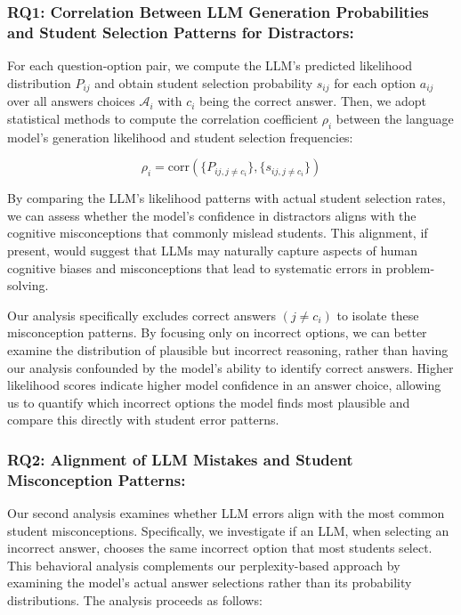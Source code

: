 \subsubsection{RQ1: Correlation Between LLM Generation Probabilities and Student Selection Patterns for Distractors:}

For each question-option pair, we compute the LLM's predicted likelihood distribution $P_{ij}$ and obtain student selection probability $s_{ij}$ for each option $a_{ij}$ over all answers choices $\mathcal{A}_i$ with $c_i$ being the correct answer. Then, we adopt statistical methods to compute the correlation coefficient $\rho_i$ between the language model's generation likelihood and student selection frequencies:

\begin{equation}
    \rho_i = \text{corr}(\{P_{ij, j \neq c_i}\}, \{s_{ij, j \neq c_i}\})
\end{equation}

By comparing the LLM's likelihood patterns with actual student selection rates, we can assess whether the model's confidence in distractors aligns with the cognitive misconceptions that commonly mislead students. This alignment, if present, would suggest that LLMs may naturally capture aspects of human cognitive biases and misconceptions that lead to systematic errors in problem-solving.

Our analysis specifically excludes correct answers $(j \neq c_i)$ to isolate these misconception patterns. By focusing only on incorrect options, we can better examine the distribution of plausible but incorrect reasoning, rather than having our analysis confounded by the model's ability to identify correct answers. Higher likelihood scores indicate higher model confidence in an answer choice, allowing us to quantify which incorrect options the model finds most plausible and compare this directly with student error patterns.


\subsubsection{RQ2: Alignment of LLM Mistakes and Student Misconception Patterns:}
Our second analysis examines whether LLM errors align with the most common student misconceptions. Specifically, we investigate if an LLM, when selecting an incorrect answer, chooses the same incorrect option that most students select. This behavioral analysis complements our perplexity-based approach by examining the model's actual answer selections rather than its probability distributions. The analysis proceeds as follows:

